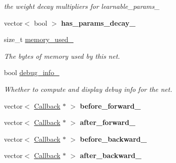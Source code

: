 \begin{DoxyCompactItemize}
\begin{DoxyCompactList}\small\item\em the weight decay multipliers for learnable\+\_\+params\+\_\+ \end{DoxyCompactList}\item 
vector$<$ bool $>$ {\bfseries has\+\_\+params\+\_\+decay\+\_\+}\hypertarget{classcaffe_1_1Net_aff06526c826350a77dd6d4f6d036b1dc}{}\label{classcaffe_1_1Net_aff06526c826350a77dd6d4f6d036b1dc}

\item 
size\+\_\+t \hyperlink{classcaffe_1_1Net_a84349f399faa4246f8395e63c9334d56}{memory\+\_\+used\+\_\+}\hypertarget{classcaffe_1_1Net_a84349f399faa4246f8395e63c9334d56}{}\label{classcaffe_1_1Net_a84349f399faa4246f8395e63c9334d56}

\begin{DoxyCompactList}\small\item\em The bytes of memory used by this net. \end{DoxyCompactList}\item 
bool \hyperlink{classcaffe_1_1Net_addc4e5501070ede24155d4c1bf9928a2}{debug\+\_\+info\+\_\+}\hypertarget{classcaffe_1_1Net_addc4e5501070ede24155d4c1bf9928a2}{}\label{classcaffe_1_1Net_addc4e5501070ede24155d4c1bf9928a2}

\begin{DoxyCompactList}\small\item\em Whether to compute and display debug info for the net. \end{DoxyCompactList}\item 
vector$<$ \hyperlink{classcaffe_1_1Net_1_1Callback}{Callback} $\ast$ $>$ {\bfseries before\+\_\+forward\+\_\+}\hypertarget{classcaffe_1_1Net_a3acc83848533272277ec51dba0286189}{}\label{classcaffe_1_1Net_a3acc83848533272277ec51dba0286189}

\item 
vector$<$ \hyperlink{classcaffe_1_1Net_1_1Callback}{Callback} $\ast$ $>$ {\bfseries after\+\_\+forward\+\_\+}\hypertarget{classcaffe_1_1Net_a30df46fee4469b52c52d5121cf8aa028}{}\label{classcaffe_1_1Net_a30df46fee4469b52c52d5121cf8aa028}

\item 
vector$<$ \hyperlink{classcaffe_1_1Net_1_1Callback}{Callback} $\ast$ $>$ {\bfseries before\+\_\+backward\+\_\+}\hypertarget{classcaffe_1_1Net_a5a0e374cc83794e4c6352bfc73471851}{}\label{classcaffe_1_1Net_a5a0e374cc83794e4c6352bfc73471851}

\item 
vector$<$ \hyperlink{classcaffe_1_1Net_1_1Callback}{Callback} $\ast$ $>$ {\bfseries after\+\_\+backward\+\_\+}\hypertarget{classcaffe_1_1Net_aa3ceeaa28b15c3bc72fa3677421f8e5a}{}\label{classcaffe_1_1Net_aa3ceeaa28b15c3bc72fa3677421f8e5a}

\end{DoxyCompactItemize}


